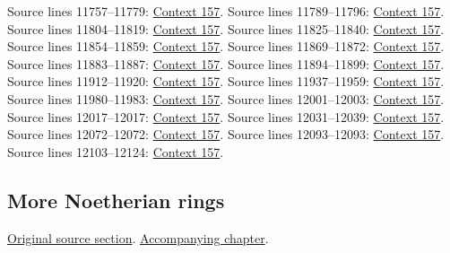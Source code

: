 \begin{AlgebraSourceRoutes}
 Source lines 11757--11779: \hyperlink{algebra-context-157}{Context 157}.
 Source lines 11789--11796: \hyperlink{algebra-context-157}{Context 157}.
 Source lines 11804--11819: \hyperlink{algebra-context-157}{Context 157}.
 Source lines 11825--11840: \hyperlink{algebra-context-157}{Context 157}.
 Source lines 11854--11859: \hyperlink{algebra-context-157}{Context 157}.
 Source lines 11869--11872: \hyperlink{algebra-context-157}{Context 157}.
 Source lines 11883--11887: \hyperlink{algebra-context-157}{Context 157}.
 Source lines 11894--11899: \hyperlink{algebra-context-157}{Context 157}.
 Source lines 11912--11920: \hyperlink{algebra-context-157}{Context 157}.
 Source lines 11937--11959: \hyperlink{algebra-context-157}{Context 157}.
 Source lines 11980--11983: \hyperlink{algebra-context-157}{Context 157}.
 Source lines 12001--12003: \hyperlink{algebra-context-157}{Context 157}.
 Source lines 12017--12017: \hyperlink{algebra-context-157}{Context 157}.
 Source lines 12031--12039: \hyperlink{algebra-context-157}{Context 157}.
 Source lines 12072--12072: \hyperlink{algebra-context-157}{Context 157}.
 Source lines 12093--12093: \hyperlink{algebra-context-157}{Context 157}.
 Source lines 12103--12124: \hyperlink{algebra-context-157}{Context 157}.
\end{AlgebraSourceRoutes}

\subsection{More Noetherian rings}
\hypertarget{algebra-source-section-Noetherian-again}{}
\noindent\href{https://github.com/stacks/stacks-project/blob/a04446e57ec1fbc252a871afcec7752fb2807b14/algebra.tex\#L12149}{Original source section}. \href{algebra.pdf\#nameddest=section-Noetherian-again}{Accompanying chapter}.

